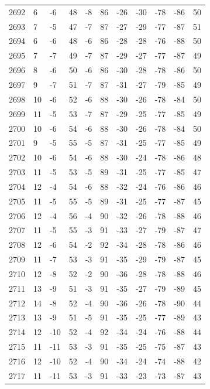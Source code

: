 \begin{table}[H]
\begin{tabular}{lllllllllll}
2692 & 6 & -6 & 48 & -8 & 86 & -26 & -30 & -78 & -86 & 50 \\
2693 & 7 & -5 & 47 & -7 & 87 & -27 & -29 & -77 & -87 & 51 \\
2694 & 6 & -6 & 48 & -6 & 86 & -28 & -28 & -76 & -88 & 50 \\
2695 & 7 & -7 & 49 & -7 & 87 & -29 & -27 & -77 & -87 & 49 \\
2696 & 8 & -6 & 50 & -6 & 86 & -30 & -28 & -78 & -86 & 50 \\
2697 & 9 & -7 & 51 & -7 & 87 & -31 & -27 & -79 & -85 & 49 \\
2698 & 10 & -6 & 52 & -6 & 88 & -30 & -26 & -78 & -84 & 50 \\
2699 & 11 & -5 & 53 & -7 & 87 & -29 & -25 & -77 & -85 & 49 \\
2700 & 10 & -6 & 54 & -6 & 88 & -30 & -26 & -78 & -84 & 50 \\
2701 & 9 & -5 & 55 & -5 & 87 & -31 & -25 & -77 & -85 & 49 \\
2702 & 10 & -6 & 54 & -6 & 88 & -30 & -24 & -78 & -86 & 48 \\
2703 & 11 & -5 & 53 & -5 & 89 & -31 & -25 & -77 & -85 & 47 \\
2704 & 12 & -4 & 54 & -6 & 88 & -32 & -24 & -76 & -86 & 46 \\
2705 & 11 & -5 & 55 & -5 & 89 & -31 & -25 & -77 & -87 & 45 \\
2706 & 12 & -4 & 56 & -4 & 90 & -32 & -26 & -78 & -88 & 46 \\
2707 & 11 & -5 & 55 & -3 & 91 & -33 & -27 & -79 & -87 & 47 \\
2708 & 12 & -6 & 54 & -2 & 92 & -34 & -28 & -78 & -86 & 46 \\
2709 & 11 & -7 & 53 & -3 & 91 & -35 & -29 & -79 & -87 & 45 \\
2710 & 12 & -8 & 52 & -2 & 90 & -36 & -28 & -78 & -88 & 46 \\
2711 & 13 & -9 & 51 & -3 & 91 & -35 & -27 & -79 & -89 & 45 \\
2712 & 14 & -8 & 52 & -4 & 90 & -36 & -26 & -78 & -90 & 44 \\
2713 & 13 & -9 & 51 & -5 & 91 & -35 & -25 & -77 & -89 & 43 \\
2714 & 12 & -10 & 52 & -4 & 92 & -34 & -24 & -76 & -88 & 44 \\
2715 & 11 & -11 & 53 & -3 & 91 & -35 & -25 & -75 & -87 & 43 \\
2716 & 12 & -10 & 52 & -4 & 90 & -34 & -24 & -74 & -88 & 42 \\
2717 & 11 & -11 & 53 & -3 & 91 & -33 & -23 & -73 & -87 & 43 \\

\end{tabular}
\end{table}
